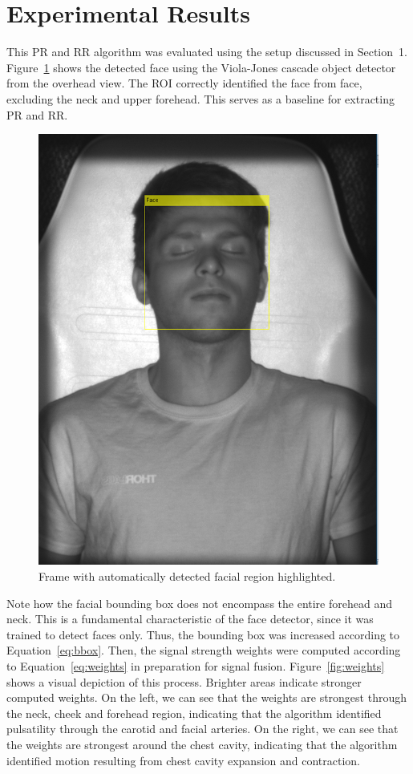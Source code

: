 \documentclass{article}
\begin{document}
\section{Experimental Results}
This PR and RR algorithm was evaluated using the setup discussed in Section~1. Figure~\ref{fig:face} shows the detected face using the Viola-Jones cascade object detector from the overhead view. The ROI correctly identified the face from face, excluding the neck and upper forehead. This serves as a baseline for extracting PR and RR.

\begin{figure}
\centering
\includegraphics[width=\textwidth]{Milestone2_FaceDetect}
\caption{Frame with automatically detected facial region highlighted.}
\label{fig:face}
\end{figure}

Note how the facial bounding box does not encompass the entire forehead and neck. This is a fundamental characteristic of the face detector, since it was trained to detect faces only. Thus, the bounding box was increased according to Equation~\ref{eq:bbox}. Then, the signal strength weights were computed according to Equation~\ref{eq:weights} in preparation for signal fusion. Figure~\ref{fig:weights} shows a visual depiction of this process. Brighter areas indicate stronger computed weights. On the left, we can see that the weights are strongest through the neck, cheek and forehead region, indicating that the algorithm identified pulsatility through the carotid and facial arteries. On the right, we can see that the weights are strongest around the chest cavity, indicating that the algorithm identified motion resulting from chest cavity expansion and contraction.
\end{document}
